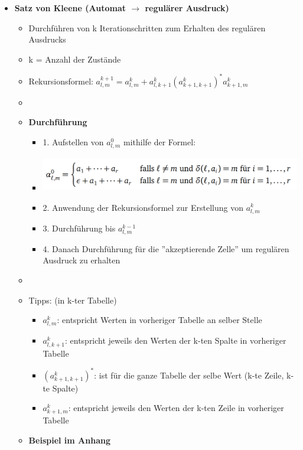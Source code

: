 \documentclass[11pt,a4paper]{article}
\begin{document}
\begin{itemize}
\begin{itemize}
	\end{itemize}

\pagebreak

\item {\large \textbf{Satz von Kleene (Automat $\rightarrow$ regulärer Ausdruck)}}
	\begin{itemize}
	\item Durchführen von k Iterationschritten zum Erhalten des regulären Ausdrucks
	\item k = Anzahl der Zustände
	\item Rekursionsformel: $a^{k+1}_{l,m} = a^k_{l,m} + a^k_{l,k+1}(a^k_{k+1,k+1})^*a^k_{k+1,m}$
	\item[]
	\item \textbf{Durchführung}
		\begin{itemize}		
		\item 1. Aufstellen von $a^0_{l,m}$ mithilfe der Formel:
		\item[]
			\begin{center}
			\includegraphics[height=1.5cm]{kleene1}
			\end{center}
		\item 2. Anwendung der Rekursionsformel zur Erstellung von $a^k_{l,m}$
		\item 3. Durchführung bis $a^{k-1}_{l,m}$
		\item 4. Danach Durchführung für die ''akzeptierende Zelle'' um regulären Ausdruck zu erhalten
	\end{itemize}
	\item[]
	\item Tipps: (in k-ter Tabelle)
		\begin{itemize}
		\item $a^k_{l,m}$:			entspricht Werten in vorheriger Tabelle an selber Stelle
		\item $a^k_{l,k+1}$:		entspricht jeweils den Werten der k-ten Spalte in vorheriger Tabelle
		\item $(a^k_{k+1,k+1})^*$: ist für die ganze Tabelle der selbe Wert (k-te Zeile, k-te Spalte)
		\item $a^k_{k+1,m}$:		entspricht jeweils den Werten der k-ten Zeile in vorheriger Tabelle
		\end{itemize}
	\item \textbf{Beispiel im Anhang}
	

\end{itemize}
\end{itemize}
\end{document}
